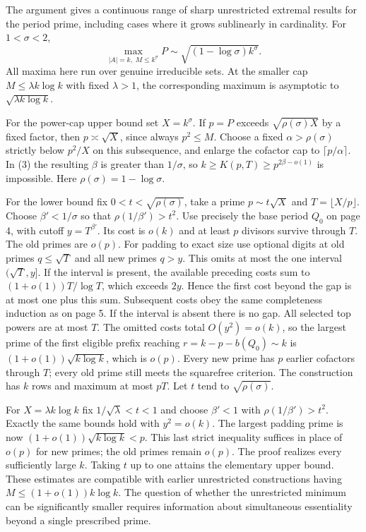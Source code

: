 \newpage
{}
The argument gives a continuous range of sharp unrestricted extremal results for the period prime, including cases where it grows sublinearly in cardinality. For $1<\sigma<2$,
\[
 \max_{|A|=k,\;M\le k^\sigma} P
      \sim \sqrt{(1-\log\sigma) k^\sigma}.
\]
All maxima here run over genuine irreducible sets. At the smaller cap $M\le\lambda k\log k$ with fixed $\lambda>1$, the corresponding maximum is asymptotic to $\sqrt{\lambda k\log k}$.

For the power-cap upper bound set $X=k^\sigma$. If $p=P$ exceeds $\sqrt{\rho(\sigma)X}$ by a fixed factor, then $p\asymp\sqrt X$, since always $p^2\le M$. Choose a fixed $\alpha>\rho(\sigma)$ strictly below $p^2/X$ on this subsequence, and enlarge the cofactor cap to $\lceil p/\alpha\rceil$. In (3) the resulting $\beta$ is greater than $1/\sigma$, so $k\ge K(p,T)\ge p^{2\beta-o(1)}$ is impossible. Here $\rho(\sigma)=1-\log\sigma$.

For the lower bound fix $0<t<\sqrt{\rho(\sigma)}$, take a prime $p\sim t\sqrt X$ and $T=\lfloor X/p\rfloor$. Choose $\beta'<1/\sigma$ so that $\rho(1/\beta')>t^2$. Use precisely the base period $Q_0$ on page 4, with cutoff $y=T^{\beta'}$. Its cost is $o(k)$ and at least $p$ divisors survive through $T$. The old primes are $o(p)$. For padding to exact size use optional digits at old primes $q\le\sqrt T$ and all new primes $q>y$. This omits at most the one interval $(\sqrt T,y]$. If the interval is present, the available preceding costs sum to $(1+o(1))T/\log T$, which exceeds $2y$. Hence the first cost beyond the gap is at most one plus this sum. Subsequent costs obey the same completeness induction as on page 5. If the interval is absent there is no gap. All selected top powers are at most $T$. The omitted costs total $O(y^2)=o(k)$, so the largest prime of the first eligible prefix reaching $r=k-p-b(Q_0)\sim k$ is $(1+o(1))\sqrt{k\log k}$, which is $o(p)$. Every new prime has $p$ earlier cofactors through $T$; every old prime still meets the squarefree criterion. The construction has $k$ rows and maximum at most $pT$. Let $t$ tend to $\sqrt{\rho(\sigma)}$.

For $X=\lambda k\log k$ fix $1/\sqrt\lambda<t<1$ and choose $\beta'<1$ with $\rho(1/\beta')>t^2$. Exactly the same bounds hold with $y^2=o(k)$. The largest padding prime is now $(1+o(1))\sqrt{k\log k}<p$. This last strict inequality suffices in place of $o(p)$ for new primes; the old primes remain $o(p)$. The proof realizes every sufficiently large $k$. Taking $t$ up to one attains the elementary upper bound. These estimates are compatible with earlier unrestricted constructions having $M\le(1+o(1))k\log k$. The question of whether the unrestricted minimum can be significantly smaller requires information about simultaneous essentiality beyond a single prescribed prime.
